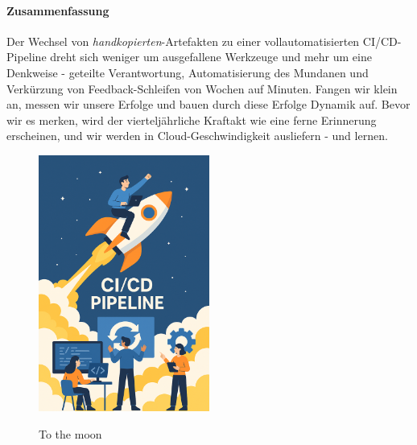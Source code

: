 \paragraph{Zusammenfassung}
Der Wechsel von \textit{handkopierten}-Artefakten zu einer vollautomatisierten CI/CD-Pipeline dreht sich weniger um ausgefallene Werkzeuge und mehr um eine Denkweise - geteilte Verantwortung, Automatisierung des Mundanen und Verkürzung von Feedback-Schleifen von Wochen auf Minuten. Fangen wir klein an, messen wir unsere Erfolge und bauen durch diese Erfolge Dynamik auf. Bevor wir es merken, wird der vierteljährliche Kraftakt wie eine ferne Erinnerung erscheinen, und wir werden in Cloud-Geschwindigkeit ausliefern - und lernen.
\begin{figure}[h!]
    \centering
    \caption{To the moon}
        \includegraphics[width=0.5\textwidth]{fig/tothemoon.png}
        \label{fig:ASD-diagram}
    \end{figure}

